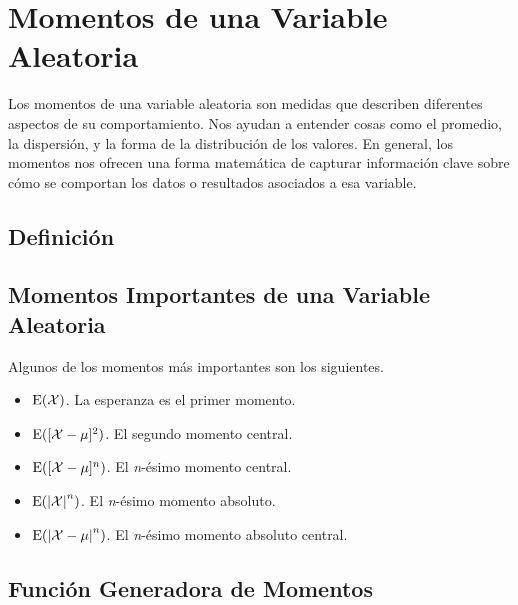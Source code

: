 \section{Momentos de una Variable Aleatoria}

Los momentos de una variable aleatoria son medidas que describen diferentes aspectos de su comportamiento. Nos ayudan a entender cosas como el promedio, la dispersión, y la forma de la distribución de los valores. En general, los momentos nos ofrecen una forma matemática de capturar información clave sobre cómo se comportan los datos o resultados asociados a esa variable.

\subsection{Definición}

\subsection{Momentos Importantes de una Variable Aleatoria}

Algunos de los momentos más importantes son los siguientes.
\begin{itemize}
  \item $\E(\mathcal X)$. La esperanza es el primer momento.
  \item $\E([\mathcal X - \mu]^2)$. El segundo momento central.
  \item $\E([\mathcal X - \mu]^n)$. El \textit{n}-ésimo momento central.
  \item $\E(\abs*{\mathcal X}^n)$. El \textit{n}-ésimo momento absoluto.
  \item $\E(\abs*{\mathcal X - \mu}^n)$. El \textit{n}-ésimo momento absoluto central.
\end{itemize}

\subsection{Función Generadora de Momentos}


